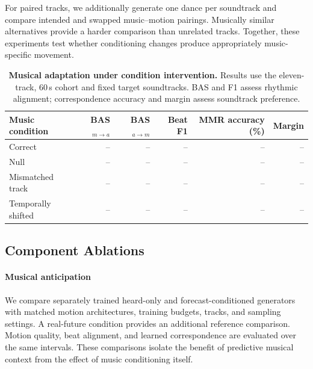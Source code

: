 For paired tracks, we additionally generate one dance
per soundtrack and compare intended and swapped
music--motion pairings.
Musically similar alternatives provide a harder comparison
than unrelated tracks.
Together, these experiments test whether conditioning
changes produce appropriately music-specific movement.

\begin{table}[t]
    \centering
    \small
    \caption{
    \textbf{Musical adaptation under condition intervention.}
    Results use the eleven-track, 60\,s cohort and fixed
    target soundtracks.
    BAS and F1 assess rhythmic alignment; correspondence
    accuracy and margin assess soundtrack preference.
    }
    \label{tab:mmr_correspondence}
    \setlength{\tabcolsep}{7pt}
    \begin{tabular}{@{}lrrrrr@{}}
        \toprule
        Music condition
        & BAS$_{m\rightarrow a}$
        & BAS$_{a\rightarrow m}$
        & Beat F1
        & MMR accuracy (\%)
        & Margin \\
        \midrule
        Correct              & -- & -- & -- & -- & -- \\
        Null                 & -- & -- & -- & -- & -- \\
        Mismatched track     & -- & -- & -- & -- & -- \\
        Temporally shifted   & -- & -- & -- & -- & -- \\
        \bottomrule
    \end{tabular}
\end{table}


\subsection{Component Ablations}
\label{sec:component_ablations}

\paragraph{Musical anticipation}
We compare separately trained heard-only and
forecast-conditioned generators with matched motion
architectures, training budgets, tracks, and sampling settings.
A real-future condition provides an additional reference
comparison.
Motion quality, beat alignment, and learned correspondence
are evaluated over the same intervals.
These comparisons isolate the benefit of predictive
musical context from the effect of music conditioning itself.

